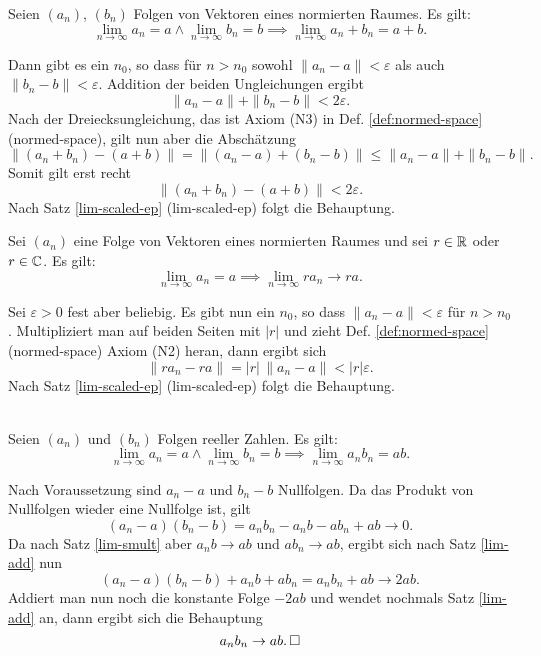 \begin{Satz}\label{lim-add}
Seien $(a_n)$, $(b_n)$ Folgen von Vektoren eines normierten Raumes.
Es gilt:
\[\lim_{n\to\infty} a_n = a\land \lim_{n\to\infty} b_n
= b \implies \lim_{n\to\infty} a_n+b_n = a+b.\]
\end{Satz}

\begin{Beweis}
Dann gibt es ein $n_0$, so dass für $n>n_0$ sowohl
$\|a_n-a\|<\varepsilon$ als auch $\|b_n-b\|<\varepsilon$.
Addition der beiden Ungleichungen ergibt
\[\|a_n-a\| + \|b_n-b\| < 2\varepsilon.\]
Nach der Dreiecksungleichung, das ist Axiom (N3) in Def.
\ref{def:normed-space} (normed-space), gilt nun aber die Abschätzung
\[\|(a_n+b_n)-(a+b)\| = \|(a_n-a)+(b_n-b)\| \le \|a_n-a\|+\|b_n-b\|.\]
Somit gilt erst recht
\[\|(a_n+b_n)-(a+b)\| < 2\varepsilon.\]
Nach Satz \ref{lim-scaled-ep} (lim-scaled-ep)
folgt die Behauptung.\,\qedsymbol
\end{Beweis}

\begin{Satz}\label{lim-smult}
Sei $(a_n)$ eine Folge von Vektoren eines normierten Raumes
und sei $r\in\mathbb R$ oder $r\in\mathbb C$. Es gilt:
\[\lim_{n\to\infty} a_n = a\implies \lim_{n\to\infty} ra_n\to ra.\]
\end{Satz}

\begin{Beweis}
Sei $\varepsilon>0$ fest aber beliebig. Es gibt nun ein $n_0$, so
dass $\|a_n-a\|<\varepsilon$ für $n>n_0$. Multipliziert man auf beiden Seiten
mit $|r|$ und zieht Def. \ref{def:normed-space} (normed-space)
Axiom (N2) heran, dann ergibt sich
\[\|ra_n-ra\| = |r|\,\|a_n-a\|<|r|\varepsilon.\]
Nach Satz \ref{lim-scaled-ep} (lim-scaled-ep)
folgt die Behauptung.\,\qedsymbol
\end{Beweis}

\begin{Satz}\mbox{}\\
Seien $(a_n)$ und $(b_n)$ Folgen
reeller Zahlen. Es gilt:
\[\lim_{n\to\infty} a_n=a\land\lim_{n\to\infty} b_n=b\implies
\lim_{n\to\infty} a_n b_n = ab.\]
\end{Satz}

\begin{Beweis}
Nach Voraussetzung sind $a_n-a$ und $b_n-b$ Nullfolgen.
Da das Produkt von Nullfolgen wieder eine Nullfolge ist, gilt
\[(a_n-a)(b_n-b) = a_n b_n-a_n b-ab_n+ab\to 0.\]
Da nach Satz \ref{lim-smult} aber $a_n b\to ab$ und $ab_n\to ab$,
ergibt sich nach Satz \ref{lim-add} nun
\[(a_n-a)(b_n-b)+a_n b+ab_n = a_n b_n+ab\to 2ab.\]
Addiert man nun noch die konstante Folge $-2ab$
und wendet nochmals Satz \ref{lim-add} an, dann ergibt sich
die Behauptung
\[a_n b_n\to ab.\,\square\]
\end{Beweis}


